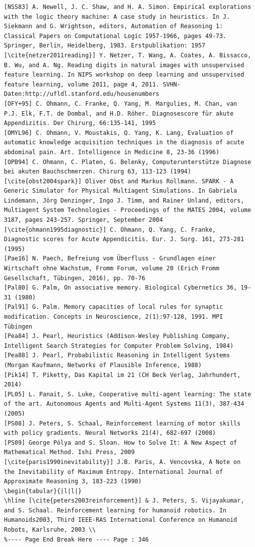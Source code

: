 \documentclass[10pt]{article}
\begin{document}
\begin{verbatim}
[NSS83] A. Newell, J. C. Shaw, and H. A. Simon. Empirical explorations with the logic theory machine: A case study in heuristics. In J. Siekmann and G. Wrightson, editors, Automation of Reasoning 1: Classical Papers on Computational Logic 1957-1966, pages 49-73. Springer, Berlin, Heidelberg, 1983. Erstpublikation: 1957
[\cite{netzer2011reading}] Y. Netzer, T. Wang, A. Coates, A. Bissacco, B. Wu, and A. Ng. Reading digits in natural images with unsupervised feature learning. In NIPS workshop on deep learning and unsupervised feature learning, volume 2011, page 4, 2011. SVHN-Daten:http://ufldl.stanford.edu/housenumbers
[OFY+95] C. Ohmann, C. Franke, Q. Yang, M. Margulies, M. Chan, van P.J. Elk, F.T. de Dombal, and H.D. Röher. Diagnosescore für akute Appendizitis. Der Chirurg, 66:135-141, 1995
[OMYL96] C. Ohmann, V. Moustakis, Q. Yang, K. Lang, Evaluation of automatic knowledge acquisition techniques in the diagnosis of acute abdominal pain. Art. Intelligence in Medicine 8, 23-36 (1996)
[OPB94] C. Ohmann, C. Platen, G. Belenky, Computerunterstütze Diagnose bei akuten Bauchschmerzen. Chirurg 63, 113-123 (1994)
[\cite{obst2004spark}] Oliver Obst and Markus Rollmann. SPARK - A Generic Simulator for Physical Multiagent Simulations. In Gabriela Lindemann, Jörg Denzinger, Ingo J. Timm, and Rainer Unland, editors, Multiagent System Technologies - Proceedings of the MATES 2004, volume 3187, pages 243-257. Springer, September 2004
[\cite{ohmann1995diagnostic}] C. Ohmann, Q. Yang, C. Franke, Diagnostic scores for Acute Appendicitis. Eur. J. Surg. 161, 273-281 (1995)
[Pae16] N. Paech, Befreiung vom Überfluss - Grundlagen einer Wirtschaft ohne Wachstum, Fromm Forum, volume 20 (Erich Fromm Gesellschaft, Tübingen, 2016), pp. 70-76
[Pal80] G. Palm, On associative memory. Biological Cybernetics 36, 19-31 (1980)
[Pal91] G. Palm. Memory capacities of local rules for synaptic modification. Concepts in Neuroscience, 2(1):97-128, 1991. MPI Tübingen
[Pea84] J. Pearl, Heuristics (Addison-Wesley Publishing Company, Intelligent Search Strategies for Computer Problem Solving, 1984)
[Pea88] J. Pearl, Probabilistic Reasoning in Intelligent Systems (Morgan Kaufmann, Networks of Plausible Inference, 1988)
[Pik14] T. Piketty, Das Kapital im 21 (CH Beck Verlag, Jahrhundert, 2014)
[PL05] L. Panait, S. Luke, Cooperative multi-agent learning: The state of the art. Autonomous Agents and Multi-Agent Systems 11(3), 387-434 (2005)
[PS08] J. Peters, S. Schaal, Reinforcement learning of motor skills with policy gradients. Neural Networks 21(4), 682-697 (2008)
[PS09] George Pólya and S. Sloan. How to Solve It: A New Aspect of Mathematical Method. Ishi Press, 2009
[\cite{paris1990inevitability}] J.B. Paris, A. Vencovska, A Note on the Inevitability of Maximum Entropy. International Journal of Approximate Reasoning 3, 183-223 (1990)
\begin{tabular}{|l|l|}
\hline [\cite{peters2003reinforcement}] & J. Peters, S. Vijayakumar, and S. Schaal. Reinforcement learning for humanoid robotics. In Humanoids2003, Third IEEE-RAS International Conference on Humanoid Robots, Karlsruhe, 2003 \\
%---- Page End Break Here ---- Page : 346


\end{verbatim}
\end{document}
